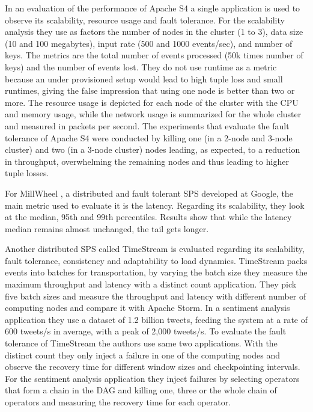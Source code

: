 \documentclass[ppgc,diss,english]{iiufrgs}
\begin{document}
In an evaluation of the performance of Apache S4 \cite{chauhan2012performance} a single application is used to observe its scalability, resource usage and fault tolerance. For the scalability analysis they use as factors the number of nodes in the cluster (1 to 3), data size (10 and 100 megabytes), input rate (500 and 1000 events/sec), and number of keys. The metrics are the total number of events processed (50k times number of keys) and the number of events lost. They do not use runtime as a metric because an under provisioned setup would lead to high tuple loss and small runtimes, giving the false impression that using one node is better than two or more. The resource usage is depicted for each node of the cluster with the CPU and memory usage, while the network usage is summarized for the whole cluster and measured in packets per second. The experiments that evaluate the fault tolerance of Apache S4 were conducted by killing one (in a 2-node and 3-node cluster) and two (in a 3-node cluster) nodes leading, as expected, to a reduction in throughput, overwhelming the remaining nodes and thus leading to higher tuple losses.

For MillWheel \cite{akidau2013millwheel}, a distributed and fault tolerant SPS developed at Google, the main metric used to evaluate it is the latency. Regarding its scalability, they look at the median, 95th and 99th percentiles. Results show that while the latency median remains almost unchanged, the tail gets longer.

Another distributed SPS called TimeStream \cite{qian2013timestream} is evaluated regarding its scalability, fault tolerance, consistency and adaptability to load dynamics. TimeStream packs events into batches for transportation, by varying the batch size they measure the maximum throughput and latency with a distinct count application. They pick five batch sizes and measure the throughput and latency with different number of computing nodes and compare it with Apache Storm. In a sentiment analysis application they use a dataset of 1.2 billion tweets, feeding the system at a rate of 600 tweets/s in average, with a peak of 2,000 tweets/s. To evaluate the fault tolerance of TimeStream the authors use same two applications. With the distinct count they only inject a failure in one of the computing nodes and observe the recovery time for different window sizes and checkpointing intervals. For the sentiment analysis application they inject failures by selecting operators that form a chain in the DAG and killing one, three or the whole chain of operators and measuring the recovery time for each operator.
\end{document}
